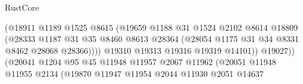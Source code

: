 \begin{lexlean}{RustCore}
\begin{coremodule}
                                            (@18911
                                              @1189
                                              @1525
                                              @8615
                                              (@19659
                                                @1188
                                                @31
                                                @1524
                                                @2102
                                                @8614
                                                @18809
                                                (@28333
                                                  @1187
                                                  @31
                                                  @35
                                                  @8460
                                                  @8613
                                                  @28364
                                                  (@28054
                                                    @1175
                                                    @31
                                                    @34
                                                    @8331
                                                    @8462
                                                    @28068
                                                    @28366))))
                                            @19310
                                            @19313
                                            @19316
                                            @19319
                                            @14101))
                                        @19027))
                                    (@20041
                                      @1204
                                      @95
                                      @45
                                      @11948
                                      @11957
                                      @2067
                                      @11962
                                      (@20051
                                        @11948
                                        @11955
                                        @2134
                                        (@19870
                                          @11947
                                          @11954
                                          @2044
                                          @11930
                                          @2051
                                          @14637

\end{coremodule}
\end{lexlean}
